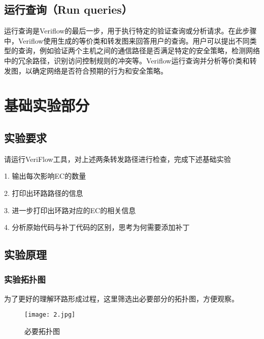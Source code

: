 \documentclass{xjtureport}
\begin{document}
\subsection{运行查询（Run queries）}
运行查询是Veriflow的最后一步，用于执行特定的验证查询或分析请求。在此步骤中，Veriflow使用生成的等价类和转发图来回答用户的查询。用户可以提出不同类型的查询，例如验证两个主机之间的通信路径是否满足特定的安全策略，检测网络中的冗余路径，识别访问控制规则的冲突等。Veriflow运行查询并分析等价类和转发图，以确定网络是否符合预期的行为和安全策略。
\section{基础实验部分}
\subsection{实验要求}
请运行VeriFlow工具，对上述两条转发路径进行检查，完成下述基础实验\par
1. 输出每次影响EC的数量 \par
2. 打印出环路路径的信息 \par 
3. 进一步打印出环路对应的EC的相关信息 \par 
4. 分析原始代码与补丁代码的区别，思考为何需要添加补丁 \par
\subsection{实验原理}
\subsubsection{实验拓扑图}
为了更好的理解环路形成过程，这里筛选出必要部分的拓扑图，方便观察。
\begin{figure}[H]
	\centering
	\texttt{[image: 2.jpg]}
	\caption{必要拓扑图}
\end{figure}
\end{document}
